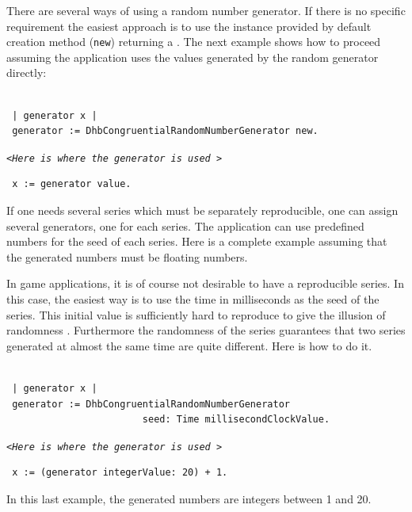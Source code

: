 \documentclass[twoside]{book}
\begin{document}
There are several ways of using a random number generator. If
there is no specific requirement the easiest approach is to use
the instance provided by default creation method ({\tt new})
returning a . The next example shows how to
proceed assuming the application uses the values generated by the
random generator directly:
\begin{codeExample}
\label{codex:crgdefault}
\begin{verbatim}

 | generator x |
 generator := DhbCongruentialRandomNumberGenerator new.
\end{verbatim}
\hfil{\tt <\sl Here is where the generator is used\tt
>}\hfil
\begin{verbatim}
 x := generator value.
\end{verbatim}
\end{codeExample}
If one needs several series which must be separately reproducible,
one can assign several generators, one for each series. The
application can use predefined numbers for the seed of each
series. Here is a complete example assuming that the generated
numbers must be floating numbers.

In game applications, it is of course not desirable to have a
reproducible series. In this case, the easiest way is to use the
time in milliseconds as the seed of the series. This initial value
is sufficiently hard to reproduce to give the illusion of
randomness . Furthermore the randomness of the series guarantees
that two series generated at almost the same time are quite
different. Here is how to do it.
\begin{codeExample}
\begin{verbatim}

 | generator x |
 generator := DhbCongruentialRandomNumberGenerator
                        seed: Time millisecondClockValue.
\end{verbatim}
\hfil{\tt <\sl Here is where the generator is used\tt
>}\hfil
\begin{verbatim}
 x := (generator integerValue: 20) + 1.
\end{verbatim}
\end{codeExample}
In this last example, the generated numbers are integers between 1
and 20.
\end{document}
